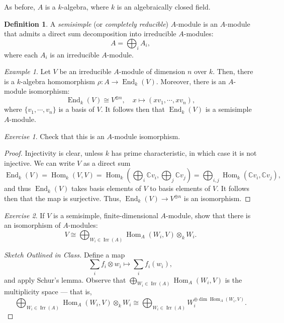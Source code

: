 \documentclass[a4paper]{report}
\theoremstyle{definition}
\newtheorem{definition}{Definition}
\theoremstyle{remark}
\theoremstyle{proposition}
\theoremstyle{conjecture}
\theoremstyle{lemma}
\theoremstyle{corollary}
\theoremstyle{exercise}
\newtheorem{exercise}{Exercise}
\theoremstyle{example}
\newtheorem{example}{Example}
\newcommand{\C}{\mathbb{C}}
\newcommand{\on}{\operatorname}
\begin{document}
As before, $A$ is a $k$-algebra, where $k$ is an algebraically closed field.

\begin{definition}
    A \emph{semisimple} (or \emph{completely reducible}) $A$-module is an
    $A$-module that admits a direct sum decomposition into irreducible
    $A$-modules: $$A = \bigoplus_i A_i,$$
    where each $A_i$ is an irreducible $A$-module.
\end{definition}

\begin{example}
    Let $V$ be an irreducible $A$-module of dimension $n$ over $k$.
    Then, there is a $k$-algebra homomorphism $\rho : A \to \on{End}_k(V)$.
    Moreover, there is an $A$-module isomorphism:
    $$\on{End}_k(V) \cong V^{\oplus n},\quad x\longmapsto (xv_1,\cdots,xv_n),$$
    where $\lbrace v_1,\cdots,v_n\rbrace$ is a basis of $V$.
    It follows then that $\on{End}_k(V)$ is a semisimple $A$-module.
    \begin{exercise}
        Check that this is an $A$-module isomorphism.
    \end{exercise}
    \begin{proof}
        Injectivity is clear, unless $k$ has prime characteristic, in which case
        it is not injective. We can write $V$ as a direct sum
        $$\on{End}_k(V) = \on{Hom}_k(V,V) = \on{Hom}_k\left(\bigoplus_i\C v_i,\bigoplus_j \C v_j\right) = \bigoplus_{i,j}\on{Hom}_k(\C v_i,\C v_j),$$
        and thus $\on{End}_k(V)$ takes basis elements of $V$ to basis elements
        of $V$. It follows then that the map is surjective. Thus, 
        $\on{End}_k(V) \to V^{\oplus n}$ is an isomorphism.
    \end{proof}
\end{example}

\begin{exercise}
    If $V$ is a semisimple, finite-dimensional $A$-module, 
    show that there is an isomorphism of $A$-modules:
    $$V \cong \bigoplus_{W_i \in \on{Irr}(A)} \on{Hom}_A(W_i,V)\otimes_k W_i.$$
\end{exercise}

\begin{proof}[Sketch Outlined in Class]
    Define a map $$\sum_i f_i\otimes w_i \longmapsto \sum_i f_i(w_i),$$
    and apply Schur's lemma. 
    Observe that $\bigoplus_{W_i \in \on{Irr}(A)} \on{Hom}_A(W_i,V)$ is the 
    multiplicity space --- that is,
    $$\bigoplus_{W_i\in\on{Irr}(A)} \on{Hom}_A(W_i,V)\otimes_kW_i \cong \bigoplus_{W_i\in\on{Irr}(A)} W_i^{\oplus \dim\on{Hom}_A(W_i,V)}.$$
\end{proof}
\end{document}
